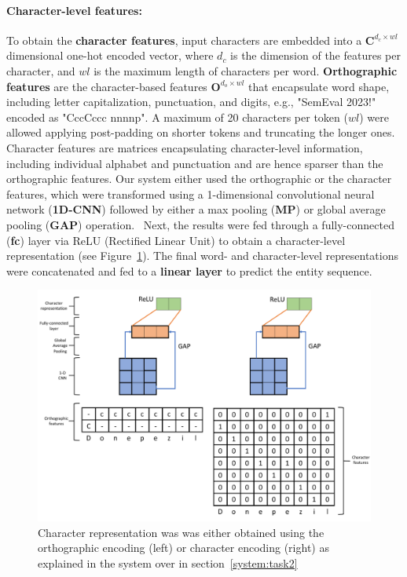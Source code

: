 \documentclass[11pt]{article}
\begin{document}
\paragraph{Character-level features: } 
%
To obtain the \textbf{character features}, input characters are embedded into a $\mathbf{C}^{d_{c} \times wl}$ dimensional one-hot encoded vector, where $d_{c}$ is the dimension of the features per character, and $wl$ is the maximum length of characters per word.
\textbf{Orthographic features} are the character-based features $\mathbf{O}^{d_{o} \times wl}$ that encapsulate word shape, including letter capitalization, punctuation, and digits, e.g., "SemEval 2023!" encoded as "CccCccc nnnnp". 
A maximum of 20 characters per token ($wl$) were allowed applying post-padding on shorter tokens and truncating the longer ones.
Character features are matrices encapsulating character-level information, including individual alphabet and punctuation and are hence sparser than the orthographic features.
Our system either used the orthographic or the character features, which were transformed using a 1-dimensional convolutional neural network (\textbf{1D-CNN}) followed by either a max pooling (\textbf{MP}) or global average pooling (\textbf{GAP}) operation.~\cite{zhou2016learning}
Next, the results were fed through a fully-connected (\textbf{fc}) layer via ReLU (Rectified Linear Unit) to obtain a character-level representation (see Figure~\ref{fig:task2_char}).
The final word- and character-level representations were concatenated and fed to a \textbf{linear layer} to predict the entity sequence.
%
%
%
\begin{figure}[!htbp]
    \centering
    \includegraphics[width=\columnwidth]{figures/word_arch2.pdf}
    \caption{Character representation was was either obtained using the orthographic encoding (left) or character encoding (right) as explained in the system over in section~\ref{system:task2}}
    \label{fig:task2_char}
\end{figure}
%
%
%
\end{document}
